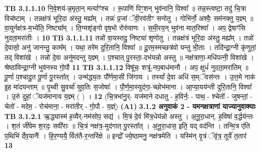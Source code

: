 \documentclass[17pt]{extarticle}
\begin{document}
                  \newline
                                \textbf{ TB 3.1.1.10} \newline
                  नि॒वे॒शय॑-न्न॒मृता॒न् मर्त्याꣳ॑श्च । रू॒पाणि॑ पिꣳ॒॒शन् भुव॑नानि॒ विश्वा᳚ ॥ तन्न॒स्त्वष्टा॒ तदु॑ चि॒त्रा विच॑ष्टाम् । तन्नक्ष॑त्रं भूरि॒दा अ॑स्तु॒ मह्य᳚म् । तन्नः॑ प्र॒जां ॅवी॒रव॑तीꣳ सनोतु । गोभि॑र्नो॒ अश्वैः॒ सम॑नक्तु य॒ज्ञ्म् ॥ वा॒युर्नक्ष॑त्र-म॒भ्ये॑ति॒ निष्ट्या᳚म् । ति॒ग्मशृ॑ङ्गो वृष॒भो रोरु॑वाणः । स॒मी॒रय॒न् भुव॑ना मात॒रिश्वा᳚ । अप॒ द्वेषाꣳ॑सि नुदता॒मरा॑तीः । \textbf{ 10} \newline
                  \newline
                                \textbf{ TB 3.1.1.11} \newline
                  तन्नो॑ वा॒यस्तदु॒ निष्ट्या॑ शृणोतु । तन्नक्ष॑त्रं भूरि॒दा अ॑स्तु॒ मह्य᳚म् । तन्नो॑ दे॒वासो॒ अनु॑ जानन्तु॒ काम᳚म् । यथा॒ तरे॑म दुरि॒तानि॒ विश्वा᳚ ॥ दू॒रम॒स्मच्छत्र॑वो यन्तु भी॒ताः । तदि॑न्द्रा॒ग्नी कृ॑णुतां॒ तद् विशा॑खे । तन्नो॑ दे॒वा अनु॑मदन्तु य॒ज्ञ्म् । प॒श्चात् पु॒रस्ता॒-दभ॑यन्नो अस्तु ॥ नक्ष॑त्राणा॒-मधि॑पत्नी॒ विशा॑खे । श्रेष्ठा॑विन्द्रा॒ग्नी भुव॑नस्य गो॒पौ \textbf{ 11} \newline
                  \newline
                                \textbf{ TB 3.1.1.12} \newline
                  विषू॑चः॒ शत्रू॑-नप॒बाध॑मानौ । अप॒ क्षुधं॑ नुदता॒मरा॑तिम् ॥ पू॒र्णा प॒श्चादु॒त पू॒र्णा पु॒रस्ता᳚त् । उन्म॑द्ध्य॒तः पौ᳚र्णमा॒सी जि॑गाय । तस्यां᳚ दे॒वा अधि॑ स॒म्ॅवस॑न्तः । उ॒त्त॒मे नाक॑ इ॒ह मा॑दयन्ताम् ॥ पृ॒थ्वी सु॒वर्चा॑ युव॒तिः स॒जोषाः᳚ । पौ॒र्ण॒मा॒स्युद॑गा॒-च्छोभ॑माना । आ॒प्या॒यय॑न्ती दुरि॒तानि॒ विश्वा᳚ । उ॒रुं दुहां॒ ॅयज॑मानाय य॒ज्ञ्म् ( ) । \textbf{ 12} \newline
                  \newline
                                    (चि॒त्रभा॑नु॒र्- यज॑माने दधातु - ह॒विर्नः॒ - पाथ॒ - श्चेतो॑ - जुषन्तां॒ - चेतो॑ - मदेम॒ - रोच॑माना॒ - मरा॑तीर् - गो॒पौ - य॒ज्ञ्ं) \textbf{(A1)} \newline \newline
                \textbf{ 3.1.2     अनुवाकं   2 - यमनक्षत्राणां याज्यानुवाक्याः} \newline
                                \textbf{ TB 3.1.2.1} \newline
                  ऋ॒द्ध्यास्म॑ ह॒व्यैर्-नम॑सोप॒ सद्य॑ । मि॒त्रं दे॒वं मि॑त्र॒धेय॑न्नो अस्तु । अ॒नू॒रा॒धान्. ह॒विषा॑ व॒र्द्धय॑न्तः । श॒तं जी॑वेम श॒रदः॒ सवी॑राः ॥ चि॒त्रं नक्ष॑त्र॒-मुद॑गात् पु॒रस्ता᳚त् । अ॒नू॒रा॒धास॒ इति॒ यद् वद॑न्ति । तन्मि॒त्र ए॑ति प॒थिभि॑ र्देव॒यानैः᳚ । हि॒र॒ण्ययै॒ र्वित॑तै-र॒न्तरि॑क्षे ॥ इन्द्रो᳚ ज्ये॒ष्ठामनु॒ नक्ष॑त्रमेति । यस्मि॑न् वृ॒त्रं ॅवृ॑त्र॒ तूर्ये॑ त॒तार॑ \textbf{ 13} \newline
\end{document}
